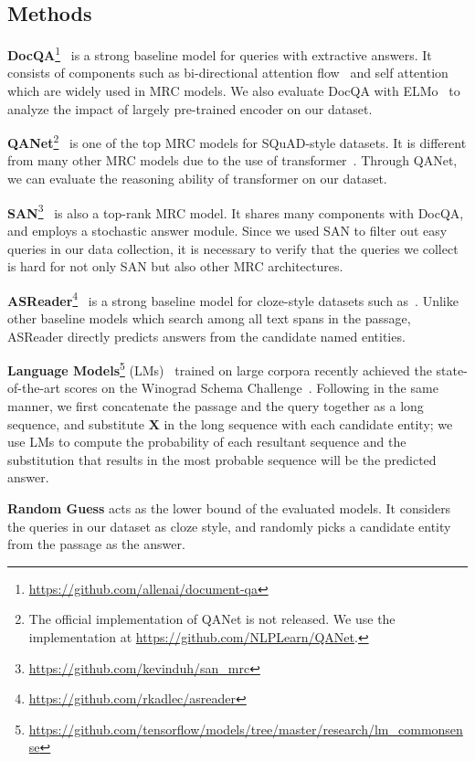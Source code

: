 \subsection{Methods}

\noindent\textbf{DocQA}\footnote{\url{https://github.com/allenai/document-qa}}~\cite{docqa} is a strong baseline model for queries with extractive answers.
It consists of components such as bi-directional attention flow~\cite{bidaf} and self attention which are widely used in MRC models.
We also evaluate DocQA with ELMo~\cite{elmo} to analyze the impact of largely pre-trained encoder on our dataset.

\noindent\textbf{QANet}\footnote{The official implementation of QANet is not released. We use the implementation at \url{https://github.com/NLPLearn/QANet}.}~\cite{qanet} is one of the top MRC models for SQuAD-style datasets.
It is different from many other MRC models due to the use of transformer~\cite{transformer}.
Through QANet, we can evaluate the reasoning ability of transformer on our dataset.

\noindent\textbf{SAN}\footnote{\url{https://github.com/kevinduh/san_mrc}}~\cite{san} is also a top-rank MRC model.
It shares many components with DocQA, and employs a stochastic answer module.
Since we used SAN to filter out easy queries in our data collection, it is necessary to verify that the queries we collect is hard for not only SAN but also other MRC architectures.

\noindent\textbf{ASReader}\footnote{\url{https://github.com/rkadlec/asreader}}~\cite{asreader} is a strong baseline model for cloze-style datasets such as~\cite{deepmind-cnn-dailymail,cbt}.
Unlike other baseline models which search among all text spans in the passage, ASReader directly predicts answers from the candidate named entities. 

\noindent\textbf{Language Models}\footnote{\url{https://github.com/tensorflow/models/tree/master/research/lm_commonsense}} (LMs)~\cite{google-lms} trained on large corpora recently achieved the state-of-the-art scores on the Winograd Schema Challenge~\cite{wsc}.
Following in the same manner, we first concatenate the passage and the query together as a long sequence, and substitute $\mathbf{X}$ in the long sequence with each candidate entity; we use LMs to compute the probability of each resultant sequence and the substitution that results in the most probable sequence will be the predicted answer.

\noindent\textbf{Random Guess} acts as the lower bound of the evaluated models. It considers the queries in our dataset as cloze style, and randomly picks a candidate entity from the passage as the answer.

